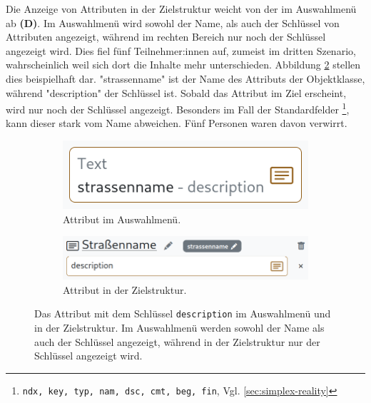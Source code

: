 \pskip
Die Anzeige von Attributen in der Zielstruktur weicht von der im Auswahlmenü ab \textbf{(D)}. Im Auswahlmenü wird sowohl der Name, als auch der Schlüssel von Attributen angezeigt, während im rechten Bereich nur noch der Schlüssel angezeigt wird. Dies fiel fünf Teilnehmer:innen auf, zumeist im dritten Szenario, wahrscheinlich weil sich dort die Inhalte mehr unterschieden. Abbildung \ref{fig:attribute-source-target} stellen dies beispielhaft dar. "strassenname" ist der Name des Attributs der Objektklasse, während "description" der Schlüssel ist. Sobald das Attribut im Ziel erscheint, wird nur noch der Schlüssel angezeigt. Besonders im Fall der Standardfelder \footnote{\texttt{ndx, key, typ, nam, dsc, cmt, beg, fin}, Vgl. \ref{sec:simplex-reality}}, kann dieser stark vom Name abweichen. Fünf Personen waren davon verwirrt.

\begin{figure}[!ht]
  \centering
  \begin{subfigure}{.3625\textwidth}
    \includegraphics[width=\linewidth]{assets/attribute-source.png}
    \caption{Attribut im Auswahlmenü.}
  \end{subfigure}
  \hspace{.025\textwidth}
  \begin{subfigure}{.5625\textwidth}
    \includegraphics[width=\linewidth]{assets/attribute-target.png}
    \caption{Attribut in der Zielstruktur.}
    \label{fig:attribute-target}
  \end{subfigure}
  \caption[Ein Attribut im Auswahlmenü und in der  Zielstruktur]{Das Attribut mit dem Schlüssel \texttt{description} im Auswahlmenü und in der  Zielstruktur. Im Auswahlmenü werden sowohl der Name als auch der Schlüssel angezeigt, während in der Zielstruktur nur der Schlüssel angezeigt wird.}
  \label{fig:attribute-source-target}
\end{figure}

